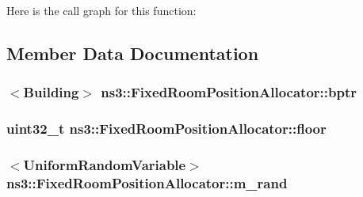 Here is the call graph for this function\+:




\subsection{Member Data Documentation}
\subsubsection[{\texorpdfstring{bptr}{bptr}}]{$<${\bf Building}$>$ ns3\+::\+Fixed\+Room\+Position\+Allocator\+::bptr\hspace{0.3cm}{\ttfamily [private]}}\hypertarget{classns3_1_1FixedRoomPositionAllocator_a535f5e37d90dc0585074928f33d4649f}{}\label{classns3_1_1FixedRoomPositionAllocator_a535f5e37d90dc0585074928f33d4649f}
\subsubsection[{\texorpdfstring{floor}{floor}}]{\setlength{\rightskip}{0pt plus 5cm}uint32\+\_\+t ns3\+::\+Fixed\+Room\+Position\+Allocator\+::floor\hspace{0.3cm}{\ttfamily [private]}}\hypertarget{classns3_1_1FixedRoomPositionAllocator_a07f2a6625304929b73cb36fecbcc1dc8}{}\label{classns3_1_1FixedRoomPositionAllocator_a07f2a6625304929b73cb36fecbcc1dc8}
\subsubsection[{\texorpdfstring{m\+\_\+rand}{m_rand}}]{$<${\bf Uniform\+Random\+Variable}$>$ ns3\+::\+Fixed\+Room\+Position\+Allocator\+::m\+\_\+rand\hspace{0.3cm}{\ttfamily [private]}}\hypertarget{classns3_1_1FixedRoomPositionAllocator_a42af4513f6adbd7c680c0ed9e7a3ca17}{}\label{classns3_1_1FixedRoomPositionAllocator_a42af4513f6adbd7c680c0ed9e7a3ca17}


